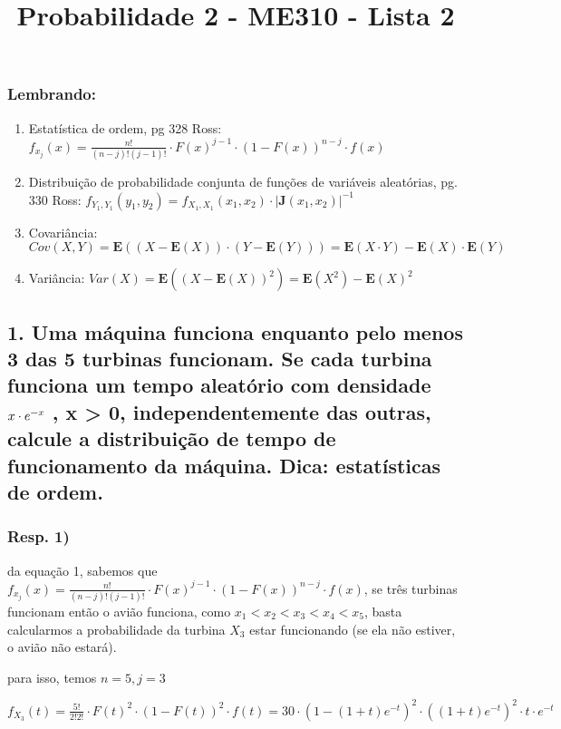 \documentclass[portuguese]{article}
\makeatletter
\newcommand{\lyxmathsym}[1]{\ifmmode\begingroup\def\b@ld{bold}
  \text{\ifx\math@version\b@ld\bfseries\fi#1}\endgroup\else#1\fi}
\makeatother
\begin{document}
\title{Probabilidade 2 - ME310 - Lista 2}

\maketitle

\subsubsection*{Lembrando:}
\begin{enumerate}
\item Estatística de ordem, pg 328 Ross: $f_{x_{j}}(x)=\frac{n!}{(n-j)!(j-1)!}\cdot F(x)^{j-1}\cdot(1-F(x))^{n-j}\cdot f(x)$
\item Distribuição de probabilidade conjunta de funções de variáveis aleatórias,
pg. 330 Ross: $f_{Y_{1},Y_{1}}(y_{1},y_{2})=f_{X_{1},X_{1}}(x_{1},x_{2})\cdot\left|\mathbf{J}(x_{1},x_{2})\right|^{-1}$
\item Covariância: $Cov(X,Y)=\mathbf{E}((X-\mathbf{E}(X))\cdot(Y-\mathbf{E}(Y)))=\mathbf{E}(X\cdot Y)-\mathbf{E}(X)\cdot\mathbf{E}(Y)$
\item Variância: $Var(X)=\mathbf{E}((X-\mathbf{E}(X))^{2})=\mathbf{E}(X^{2})-\mathbf{E}(X)^{2}$
\end{enumerate}
\pagebreak{}


\subsection*{\textmd{1. Uma máquina funciona enquanto pelo menos 3 das 5 turbinas
funcionam. Se cada turbina funciona um tempo aleatório com densidade
$x\cdot e^{\lyxmathsym{\textminus}x}$ , x > 0, independentemente
das outras, calcule a distribuição de tempo de funcionamento da máquina.
Dica: estatísticas de ordem. }}


\subsubsection*{\textmd{Resp}. \textmd{1)}}

da equação 1, sabemos que $f_{x_{j}}(x)=\frac{n!}{(n-j)!(j-1)!}\cdot F(x)^{j-1}\cdot(1-F(x))^{n-j}\cdot f(x)$,
se três turbinas funcionam então o avião funciona, como $x_{1}<x_{2}<x_{3}<x_{4}<x_{5}$,
basta calcularmos a probabilidade da turbina $X_{3}$ estar funcionando
(se ela não estiver, o avião não estará).

para isso, temos $n=5,j=3$

$f_{X_{3}}(t)=\frac{5!}{2!2!}\cdot F(t)^{2}\cdot(1-F(t))^{2}\cdot f(t)=30\cdot(1-(1+t)e^{-t})^{2}\cdot((1+t)e^{-t})^{2}\cdot t\cdot e^{-t}$
\end{document}
